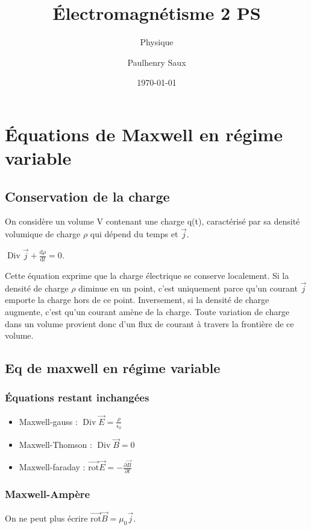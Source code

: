 \documentclass[french]{yLectureNote}
\title{Électromagnétisme 2 PS}
\subtitle{Physique}
\author{Paulhenry Saux}
\date{\today}
\renewcommand{\vec}{\overrightarrow}
\newcommand{\dd}{\mathrm{d}}
\DeclareMathOperator{\Div}{Div}
\newcommand{\rot}{\vec{\mathrm{rot}}}
\begin{document}
\chapter{Équations de Maxwell en régime variable}
\section{Conservation de la charge}
On considère un volume V contenant une charge q(t), caractérisé par sa densité volumique de charge $\rho$ qui dépend du temps et $\vec{j}$.




\begin{theorem}
    $\Div\vec{j}+\frac{\dd \rho}{\dd t}= 0$.
\end{theorem}
Cette équation exprime que la charge électrique se conserve localement. Si la densité de charge $\rho$ diminue en un point, c'est uniquement parce qu'un courant $\vec{j}$ emporte la charge hors de ce point. Inversement, si la densité de charge augmente, c'est qu'un courant amène de la charge. Toute variation de charge dans un volume provient donc d'un flux de courant à travers la frontière de ce volume.

\section{Eq de maxwell en régime variable}
\subsection{Équations restant inchangées}
\begin{itemize}
    \item Maxwell-gauss : $\Div \vec{E} = \frac{\rho}{\epsilon_0}$
    \item Maxwell-Thomson : $\Div\vec{B} = 0$
    \item Maxwell-faraday : $\rot\vec{E} = -\frac{\partial \vec{B}}{\partial t}$
\end{itemize}
\subsection{Maxwell-Ampère}
On ne peut plus écrire $ \rot\vec{B} = \mu_0\vec{j}$.
\end{document}
